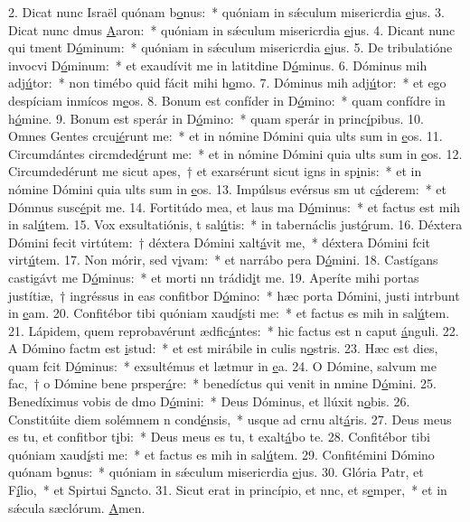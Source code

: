 2. Dicat nunc Israël quónam b\uline{o}nus:~* quóniam in sǽculum misericrdia \uline{e}jus.
3. Dicat nunc dmus \uline{A}aron:~* quóniam in sǽculum misericrdia \uline{e}jus.
4. Dicant nunc qui tment D\uline{ó}minum:~* quóniam in sǽculum misericrdia \uline{e}jus.
5. De tribulatióne invocvi D\uline{ó}minum:~* et exaudívit me in latitdine D\uline{ó}minus.
6. Dóminus mih adj\uline{ú}tor:~* non timébo quid fácit mihi h\uline{o}mo.
7. Dóminus mih adj\uline{ú}tor:~* et ego despíciam inmícos m\uline{e}os.
8. Bonum est confíder in D\uline{ó}mino:~* quam confídre in h\uline{ó}mine.
9. Bonum est sperár in D\uline{ó}mino:~* quam sperár in princ\uline{í}pibus.
10. Omnes Gentes crcu\uline{ié}runt me:~* et in nómine Dómini quia ults sum in \uline{e}os.
11. Circumdántes circmded\uline{é}runt me:~* et in nómine Dómini quia ults sum in \uline{e}os.
12. Circumdedérunt me sicut apes,~† et exarsérunt sicut igns in sp\uline{i}nis:~* et in nómine Dómini quia ults sum in \uline{e}os.
13. Impúlsus evérsus sm ut c\uline{á}derem:~* et Dómnus susc\uline{é}pit me.
14. Fortitúdo mea, et laus ma D\uline{ó}minus:~* et factus est mih in sal\uline{ú}tem.
15. Vox exsultatiónis, t sal\uline{ú}tis:~* in tabernáclis just\uline{ó}rum.
16. Déxtera Dómini fecit virtútem:~† déxtera Dómini xalt\uline{á}vit me,~* déxtera Dómini fcit virt\uline{ú}tem.
17. Non mórir, sed v\uline{i}vam:~* et narrábo pera D\uline{ó}mini.
18. Castígans castigávt me D\uline{ó}minus:~* et morti nn trádid\uline{i}t me.
19. Aperíte mihi portas justítiæ,~† ingréssus in eas confitbor D\uline{ó}mino:~* hæc porta Dómini, justi intrbunt in \uline{e}am.
20. Confitébor tibi quóniam xaud\uline{í}sti me:~* et factus es mih in sal\uline{ú}tem.
21. Lápidem, quem reprobavérunt ædfic\uline{á}ntes:~* hic factus est n caput \uline{á}nguli.
22. A Dómino factm est \uline{i}stud:~* et est mirábile in culis n\uline{o}stris.
23. Hæc est dies, quam fcit D\uline{ó}minus:~* exsultémus et lætmur in \uline{e}a.
24. O Dómine, salvum me fac,~† o Dómine bene prsper\uline{á}re:~* benedíctus qui venit in nmine D\uline{ó}mini.
25. Benedíximus vobis de dmo D\uline{ó}mini:~* Deus Dóminus, et llúxit n\uline{o}bis.
26. Constitúite diem solémnem n cond\uline{é}nsis,~* usque ad crnu alt\uline{á}ris.
27. Deus meus es tu, et confitbor t\uline{i}bi:~* Deus meus es tu, t exalt\uline{á}bo te.
28. Confitébor tibi quóniam xaud\uline{í}sti me:~* et factus es mih in sal\uline{ú}tem.
29. Confitémini Dómino quónam b\uline{o}nus:~* quóniam in sǽculum misericrdia \uline{e}jus.
30. Glória Patr, et F\uline{í}lio,~* et Spirtui S\uline{a}ncto.
31. Sicut erat in princípio, et nnc, et s\uline{e}mper,~* et in sǽcula sæclórum. \uline{A}men.
